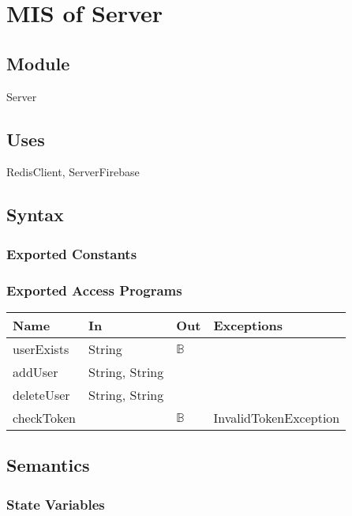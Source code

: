 \documentclass[12pt, titlepage]{article}
\begin{document}
\medskip
\newpage
\section{MIS of Server} \label{Server} 

\subsection{Module}

Server

\subsection{Uses}

RedisClient, ServerFirebase

\subsection{Syntax}

\subsubsection{Exported Constants}

\subsubsection{Exported Access Programs}

\begin{center}
\begin{tabular}{p{2cm} p{4cm} p{4cm} p{2cm}}
\hline
\textbf{Name} & \textbf{In} & \textbf{Out} & \textbf{Exceptions} \\
\hline
userExists & String & $\mathbb{B}$ & \\ \hline
addUser & String, String & & \\ \hline
deleteUser & String, String & & \\ \hline
checkToken & & $\mathbb{B}$ & InvalidTokenException \\
\hline
\end{tabular}
\end{center}

\subsection{Semantics}

\subsubsection{State Variables}
\end{document}
